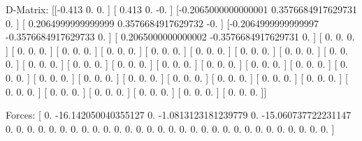 D-Matrix:
[[-0.413               0.                  0.                ]
 [ 0.413               0.                 -0.                ]
 [-0.2065000000000001  0.3576684917629731  0.                ]
 [ 0.2064999999999999  0.3576684917629732 -0.                ]
 [-0.2064999999999997 -0.3576684917629733  0.                ]
 [ 0.2065000000000002 -0.3576684917629731  0.                ]
 [ 0.                  0.                  0.                ]
 [ 0.                  0.                  0.                ]
 [ 0.                  0.                  0.                ]
 [ 0.                  0.                  0.                ]
 [ 0.                  0.                  0.                ]
 [ 0.                  0.                  0.                ]
 [ 0.                  0.                  0.                ]
 [ 0.                  0.                  0.                ]
 [ 0.                  0.                  0.                ]
 [ 0.                  0.                  0.                ]
 [ 0.                  0.                  0.                ]
 [ 0.                  0.                  0.                ]
 [ 0.                  0.                  0.                ]
 [ 0.                  0.                  0.                ]
 [ 0.                  0.                  0.                ]
 [ 0.                  0.                  0.                ]
 [ 0.                  0.                  0.                ]
 [ 0.                  0.                  0.                ]
 [ 0.                  0.                  0.                ]
 [ 0.                  0.                  0.                ]
 [ 0.                  0.                  0.                ]
 [ 0.                  0.                  0.                ]
 [ 0.                  0.                  0.                ]
 [ 0.                  0.                  0.                ]
 [ 0.                  0.                  0.                ]
 [ 0.                  0.                  0.                ]
 [ 0.                  0.                  0.                ]
 [ 0.                  0.                  0.                ]
 [ 0.                  0.                  0.                ]
 [ 0.                  0.                  0.                ]]

Forces:
[  0.                 -16.142050040355127    0.
  -1.0813123181239779   0.                 -15.060737722231147
   0.                   0.                   0.
   0.                   0.                   0.
   0.                   0.                   0.
   0.                   0.                   0.
   0.                   0.                   0.
   0.                   0.                   0.
   0.                   0.                   0.
   0.                   0.                   0.
   0.                   0.                   0.
   0.                   0.                   0.                ]

